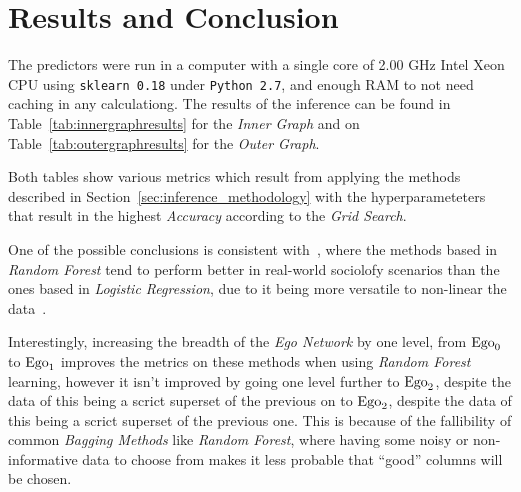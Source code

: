 \section{Results and Conclusion}
\label{sec:results}


The predictors were run in a computer with a single core of 2.00 GHz Intel Xeon CPU using \texttt{sklearn 0.18} under \texttt{Python 2.7}, and enough RAM to not need caching in any calculationg. The results of the inference can be found in Table~\ref{tab:innergraphresults} for the \emph{Inner Graph} and on Table~\ref{tab:outergraphresults} for the \emph{Outer Graph}.


Both tables show various metrics which result from applying the methods described in Section~\ref{sec:inference_methodology} with the hyperparameteters that result in the highest \emph{Accuracy} according to the \emph{Grid Search}.

One of the possible conclusions is consistent with~\cite{muchlinski2016}, where the methods based in \emph{Random Forest} tend to perform better in real-world sociolofy scenarios than the ones based in \emph{Logistic Regression}, due to it being more versatile to non-linear the data~\cite{logisticvsdecision}.

Interestingly, increasing the breadth of the \emph{Ego Network} by one level, from $\operatorname{Ego}_0$ to $\operatorname{Ego}_1$ improves the metrics on these methods when using \emph{Random Forest} learning, however it isn't improved by going one level further to $\operatorname{Ego}_2$, despite the data of this being a scrict superset of the previous on to $\operatorname{Ego}_2$, despite the data of this being a scrict superset of the previous one. This is because of the fallibility of common \emph{Bagging Methods} like \emph{Random Forest}, where having some noisy or non-informative data to choose from makes it less probable that ``good'' columns will be chosen.

